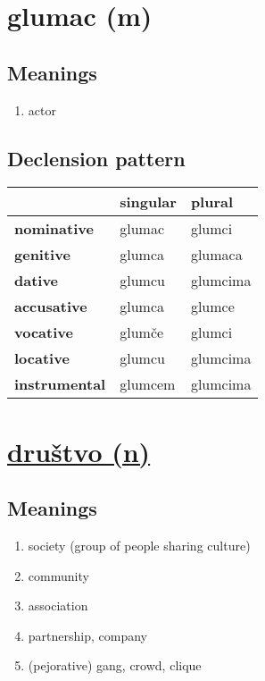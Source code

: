 \filbreak
\section{glumac (m)}
\subsection*{Meanings}
\begin{enumerate}
\item actor
\end{enumerate}
\subsection*{Declension pattern}
\begin{tabularx}{\linewidth}{Xll}
\toprule
{} & singular &    plural \\
\midrule
\textbf{nominative  } &   glumac &    glumci \\
\textbf{genitive    } &   glumca &   glumaca \\
\textbf{dative      } &   glumcu &  glumcima \\
\textbf{accusative  } &   glumca &    glumce \\
\textbf{vocative    } &   glumče &    glumci \\
\textbf{locative    } &   glumcu &  glumcima \\
\textbf{instrumental} &  glumcem &  glumcima \\
\bottomrule
\end{tabularx}

\filbreak
\section{\underline{društvo (n)}}
\subsection*{Meanings}
\begin{enumerate}
\item society (group of people sharing culture)
\item community
\item association
\item partnership, company
\item (pejorative) gang, crowd, clique
\end{enumerate}

